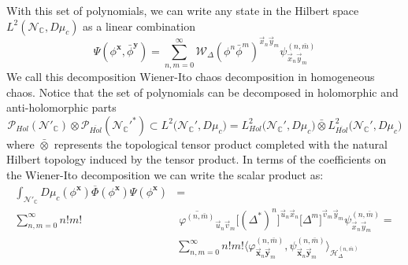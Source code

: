 \documentclass[12pt]{article}%
\begin{document}
 With this set of polynomials, we can write any state in the Hilbert space $L^2(\mathcal{N}_\mathbb{C}, D\mu_c) $ as a linear combination 
    \begin{equation}
    \label{eq:ComplexWienerItodec}
    \Psi(\phi^{\mathbf{x}},\bar\phi^\mathbf{y})=\sum_{n,m=0}^\infty\mathcal{W}_\Delta(\phi^n\bar{\phi}^m)^{\vec{x}_n\vec{y}_m}\psi^{(n,\bar{m})}_{\vec{x}_n\vec{y}_m} 
    \end{equation}
    We call this decomposition Wiener-Ito chaos decomposition in homogeneous chaos.
    Notice that the set of polynomials can be decomposed in holomorphic and anti-holomorphic parts 
    \begin{equation}
    \label{eq:ComplexPolinomials}
    \mathcal{P}_{Hol}(\mathcal{N}'_{\mathbb{C}})\otimes \mathcal{P}_{\overline{Hol}}({\mathcal{N}_{\mathbb{C}}'}^*)\subset L^2\big({\mathcal{N}_{\mathbb{C}}'},D\mu_c\big)= L^2_{Hol}\big({\mathcal{N}_{\mathbb{C}}'}, D\mu_c\big)\bar{\otimes} L^2_{\overline{Hol}}\big({\mathcal{N}_{\mathbb{C}}'}, D\mu_c\big)
    \end{equation}
    where $\bar{\otimes}$ represents the topological tensor product completed with the natural Hilbert topology induced by the tensor product. In terms of the coefficients on the Wiener-Ito decomposition we can write the scalar product as:
    \begin{align}
    \label{eq:complexchaosDecomposition}
    \int_{\mathcal{N}'_\mathbb{C}}D\mu_c(\phi^\mathbf{x})\overline{\Phi}(\phi^\mathbf{x})\Psi(\phi^\mathbf{x})
    &= \nonumber \\ \sum_{n,m=0}^\infty n!m!&\ \overline{\varphi^{(n,\bar{m})}}_{\vec{u}_n\vec{v}_m}\big[(\Delta^*)^n\big]^{\vec{u}_n\vec{x}_n} \big[\Delta^m\big]^{\vec{v}_m\vec{y}_m} \psi^{(n,\bar{m})}_{\vec{x}_n\vec{y}_m}
    =\nonumber \\ &
    \sum_{n,m=0}^\infty n!m! \big\langle\varphi^{(n,\bar{m})}_{\vec{\mathbf{x}}_n\vec{\mathbf{y}}_m},\psi^{(n,\bar{m})}_{\vec{\mathbf{x}}_n\vec{\mathbf{y}}_m}\big\rangle_{\mathcal{H}^{(n,\bar{m})}_\Delta}
    \end{align}
\end{document}
